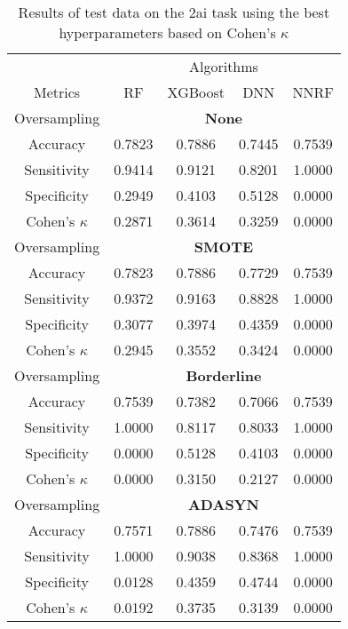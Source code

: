 \begin{table}[!htb]
\centering
\caption{Results of test data on the 2ai task using the best hyperparameters based on Cohen's $\kappa$}
\label{tab:2ai_test_results}
\begin{tabular}{c | c c c c}
\hline
 & \multicolumn{4}{c}{Algorithms}\\ 
Metrics &RF & XGBoost & DNN & NNRF\\ 
\hline
Oversampling &\multicolumn{4}{|c}{\textbf{None}}\\ 
\hline
Accuracy & 0.7823 & 0.7886 & 0.7445 & 0.7539\\ 
Sensitivity & 0.9414 & 0.9121 & 0.8201 & 1.0000\\ 
Specificity & 0.2949 & 0.4103 & 0.5128 & 0.0000\\ 
Cohen's $\kappa$ & 0.2871 & 0.3614 & 0.3259 & 0.0000\\ 
\hline
Oversampling &\multicolumn{4}{|c}{\textbf{SMOTE}}\\ 
\hline
Accuracy & 0.7823 & 0.7886 & 0.7729 & 0.7539\\ 
Sensitivity & 0.9372 & 0.9163 & 0.8828 & 1.0000\\ 
Specificity & 0.3077 & 0.3974 & 0.4359 & 0.0000\\ 
Cohen's $\kappa$ & 0.2945 & 0.3552 & 0.3424 & 0.0000\\ 
\hline
Oversampling &\multicolumn{4}{|c}{\textbf{Borderline}}\\ 
\hline
Accuracy & 0.7539 & 0.7382 & 0.7066 & 0.7539\\ 
Sensitivity & 1.0000 & 0.8117 & 0.8033 & 1.0000\\ 
Specificity & 0.0000 & 0.5128 & 0.4103 & 0.0000\\ 
Cohen's $\kappa$ & 0.0000 & 0.3150 & 0.2127 & 0.0000\\ 
\hline
Oversampling &\multicolumn{4}{|c}{\textbf{ADASYN}}\\ 
\hline
Accuracy & 0.7571 & 0.7886 & 0.7476 & 0.7539\\ 
Sensitivity & 1.0000 & 0.9038 & 0.8368 & 1.0000\\ 
Specificity & 0.0128 & 0.4359 & 0.4744 & 0.0000\\ 
Cohen's $\kappa$ & 0.0192 & 0.3735 & 0.3139 & 0.0000\\ 
\hline
\end{tabular}
\end{table}

